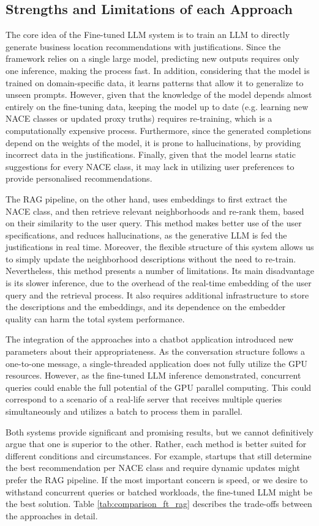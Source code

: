 \subsection{Strengths and Limitations of each Approach}


The core idea of the Fine-tuned LLM system is to train an LLM to directly generate business location recommendations with justifications. Since the framework relies on a single large model, predicting new outputs requires only one inference, making the process fast. In addition, considering that the model is trained on domain-specific data, it learns patterns that allow it to generalize to unseen prompts. However, given that the knowledge of the model depends almost entirely on the fine-tuning data, keeping the model up to date (e.g. learning new NACE classes or updated proxy truths) requires re-training, which is a computationally expensive process. Furthermore, since the generated completions depend on the weights of the model, it is prone to hallucinations, by providing incorrect data in the justifications. Finally, given that the model learns static suggestions for every NACE class, it may lack in utilizing user preferences to provide personalised recommendations.


The RAG pipeline, on the other hand, uses embeddings to first extract the NACE class, and then retrieve relevant neighborhoods and re-rank them, based on their similarity to the user query. This method makes better use of the user specifications, and reduces hallucinations, as the generative LLM is fed the justifications in real time. Moreover, the flexible structure of this system allows us to simply update the neighborhood descriptions without the need to re-train. Nevertheless, this method presents a number of limitations. Its main disadvantage is its slower inference, due to the overhead of the real-time embedding of the user query and the retrieval process. It also requires additional infrastructure to store the descriptions and the embeddings, and its dependence on the embedder quality can harm the total system performance.

The integration of the approaches into a chatbot application introduced new parameters about their appropriateness. As the conversation structure follows a one-to-one message, a single-threaded application does not fully utilize the GPU resources. However, as the fine-tuned LLM inference demonstrated, concurrent queries could enable the full potential of the GPU parallel computing. This could correspond to a scenario of a real-life server that receives multiple queries simultaneously and utilizes a batch to process them in parallel.

Both systems provide significant and promising results, but we cannot definitively argue that one is superior to the other. Rather, each method is better suited for different conditions and circumstances. For example, startups that still determine the best recommendation per NACE class and require dynamic updates might prefer the RAG pipeline. If the most important concern is speed, or we desire to withstand concurrent queries or batched workloads, the fine-tuned LLM might be the best solution. Table \ref{tab:comparison_ft_rag} describes the trade-offs between the approaches in detail.


